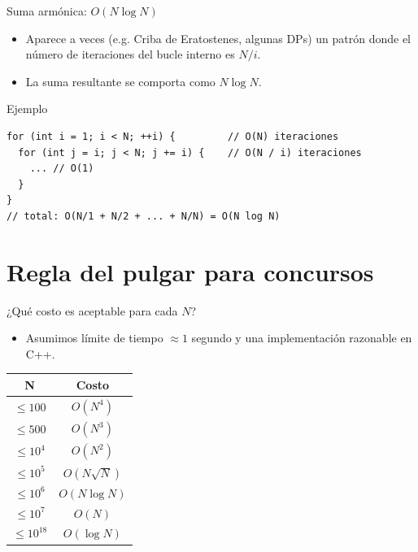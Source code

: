 \documentclass[aspectratio=169]{beamer}
\begin{document}
\begin{frame}[fragile]{Suma armónica: \(O(N \log N)\)}
  \begin{itemize}
    \item Aparece a veces (e.g. Criba de Eratostenes, algunas DPs) un patrón donde el número de iteraciones del bucle interno es \(N / i\).
    \item La suma resultante se comporta como \(N \log N\).
  \end{itemize}
  \begin{block}{Ejemplo}
  \begin{lstlisting}[style=customc]
for (int i = 1; i < N; ++i) {         // O(N) iteraciones
  for (int j = i; j < N; j += i) {    // O(N / i) iteraciones
    ... // O(1)
  }
}
// total: O(N/1 + N/2 + ... + N/N) = O(N log N)
  \end{lstlisting}
  \end{block}
\end{frame}

\section{Regla del pulgar para concursos}

\begin{frame}{¿Qué costo es aceptable para cada \(N\)?}
  \begin{itemize}
    \item Asumimos límite de tiempo \(\approx 1\) segundo y una implementación razonable en C++.
  \end{itemize}
  \vspace{0.3cm}
  \begin{center}
  \begin{tabular}{|c|c|}
    \hline
    \textbf{N} & \textbf{Costo} \\
    \hline
    \(\le 100\)   & \(O(N^4)\) \\
    \(\le 500\)   & \(O(N^3)\) \\
    \(\le 10^4\)  & \(O(N^2)\) \\
    \(\le 10^5\)  & \(O(N \sqrt{N})\) \\
    \(\le 10^6\)  & \(O(N \log N)\) \\
    \(\le 10^7\)  & \(O(N)\) \\
    \(\le 10^{18}\) & \(O(\log N)\) \\
    \hline
  \end{tabular}
  \end{center}
\end{frame}
\end{document}
